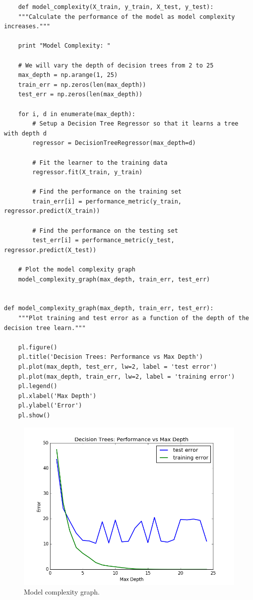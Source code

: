 \documentclass[12 pt]{article}
\numberwithin{equation}{section}
\begin{document}
\begin{verbatim}
	def model_complexity(X_train, y_train, X_test, y_test):
    """Calculate the performance of the model as model complexity increases."""

    print "Model Complexity: "

    # We will vary the depth of decision trees from 2 to 25
    max_depth = np.arange(1, 25)
    train_err = np.zeros(len(max_depth))
    test_err = np.zeros(len(max_depth))

    for i, d in enumerate(max_depth):
        # Setup a Decision Tree Regressor so that it learns a tree with depth d
        regressor = DecisionTreeRegressor(max_depth=d)

        # Fit the learner to the training data
        regressor.fit(X_train, y_train)

        # Find the performance on the training set
        train_err[i] = performance_metric(y_train, regressor.predict(X_train))

        # Find the performance on the testing set
        test_err[i] = performance_metric(y_test, regressor.predict(X_test))

    # Plot the model complexity graph
    model_complexity_graph(max_depth, train_err, test_err)


def model_complexity_graph(max_depth, train_err, test_err):
    """Plot training and test error as a function of the depth of the decision tree learn."""

    pl.figure()
    pl.title('Decision Trees: Performance vs Max Depth')
    pl.plot(max_depth, test_err, lw=2, label = 'test error')
    pl.plot(max_depth, train_err, lw=2, label = 'training error')
    pl.legend()
    pl.xlabel('Max Depth')
    pl.ylabel('Error')
    pl.show()
\end{verbatim}

\begin{figure}[t]
\begin{center}
		\includegraphics[scale=0.4]{model_complexity}
		\caption{Model complexity graph.}
\end{center}
\end{figure}
\end{document}
